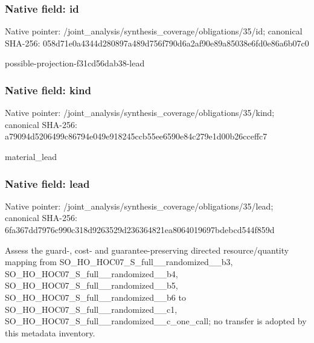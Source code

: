 \documentclass[10pt,a4paper]{article}
\begin{document}
\subsubsection{Native field: id}
Native pointer: /joint\_\allowbreak{}analysis/synthesis\_\allowbreak{}coverage/obligations/35/id; canonical SHA-256: 058d71e0a4344d280897a489d756f790d6a2af90e89a85038e6fd0e86a6b07c0

\begingroup\raggedright\sloppy possible-projection-f31cd56dab38-lead\par\endgroup

\subsubsection{Native field: kind}
Native pointer: /joint\_\allowbreak{}analysis/synthesis\_\allowbreak{}coverage/obligations/35/kind; canonical SHA-256: a79094d5206499c86794e049e918245ccb55ee6590e84c279e1d00b26cceffc7

\begingroup\raggedright\sloppy material\_\allowbreak{}lead\par\endgroup

\subsubsection{Native field: lead}
Native pointer: /joint\_\allowbreak{}analysis/synthesis\_\allowbreak{}coverage/obligations/35/lead; canonical SHA-256: 6fa367dd7976c990c318d9263529d236364821ea8064019697bdebcd544f859d

\begingroup\raggedright\sloppy Assess the guard-,\allowbreak{} cost- and guarantee-preserving directed resource/\allowbreak{}quantity mapping from SO\_\allowbreak{}HO\_\allowbreak{}HOC07\_\allowbreak{}S\_\allowbreak{}full\_\allowbreak{}\_\allowbreak{}randomized\_\allowbreak{}\_\allowbreak{}b3,\allowbreak{} SO\_\allowbreak{}HO\_\allowbreak{}HOC07\_\allowbreak{}S\_\allowbreak{}full\_\allowbreak{}\_\allowbreak{}randomized\_\allowbreak{}\_\allowbreak{}b4,\allowbreak{} SO\_\allowbreak{}HO\_\allowbreak{}HOC07\_\allowbreak{}S\_\allowbreak{}full\_\allowbreak{}\_\allowbreak{}randomized\_\allowbreak{}\_\allowbreak{}b5,\allowbreak{} SO\_\allowbreak{}HO\_\allowbreak{}HOC07\_\allowbreak{}S\_\allowbreak{}full\_\allowbreak{}\_\allowbreak{}randomized\_\allowbreak{}\_\allowbreak{}b6 to SO\_\allowbreak{}HO\_\allowbreak{}HOC07\_\allowbreak{}S\_\allowbreak{}full\_\allowbreak{}\_\allowbreak{}randomized\_\allowbreak{}\_\allowbreak{}c1,\allowbreak{} SO\_\allowbreak{}HO\_\allowbreak{}HOC07\_\allowbreak{}S\_\allowbreak{}full\_\allowbreak{}\_\allowbreak{}randomized\_\allowbreak{}\_\allowbreak{}c\_\allowbreak{}one\_\allowbreak{}call;\allowbreak{} no transfer is adopted by this metadata inventory.\par\endgroup
\end{document}
